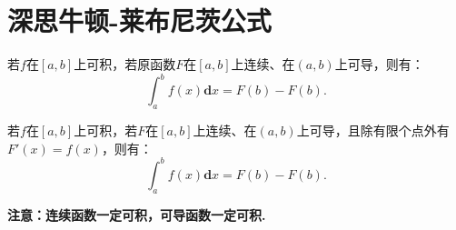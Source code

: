 \section{深思牛顿-莱布尼茨公式}

\begin{theorem}
	若$f$在$[a,b]$上可积，若原函数$F$在$[a,b]$上连续、在$(a,b)$上可导，则有：
	\begin{equation}
		\int_{a}^{b}f(x)\textbf{d}x = F(b)-F(b).
	\end{equation}
\end{theorem}

\begin{proposition}
	若$f$在$[a,b]$上可积，若$F$在$[a,b]$上连续、在$(a,b)$上可导，且除有限个点外有$F'(x)=f(x)$，则有：
	\begin{equation}
		\int_{a}^{b}f(x)\textbf{d}x = F(b)-F(b).
	\end{equation}
\end{proposition}

\textbf{注意：连续函数一定可积，可导函数一定可积.}

